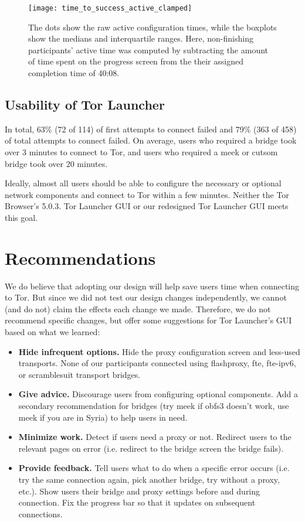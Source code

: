 \documentclass[USenglish,oneside,twocolumn]{article}
\begin{document}
\begin{figure}[t]
\centering
\texttt{[image: time\_to\_success\_active\_clamped]}
\caption{
The dots show the raw active configuration times,
while the boxplots show the medians and interquartile ranges.
Here, non-finishing participants' active time was computed by
subtracting the amount of time spent on the progress screen from the 
their assigned completion time of 40:08.
}
\label{fig:time_to_success_active_clamped}
\end{figure}

\subsection{Usability of Tor Launcher} 
In total, 63\% (72 of 114) of first attempts to connect failed and 79\% (363 of 458) of total attempts to connect failed. 
On average, users who required a bridge took over 3 minutes to connect to Tor, and users who required a meek or cutsom bridge took over 20 minutes.

Ideally, almost all users should be able to configure the necessary or optional network components and connect to Tor within a few minutes. Neither the Tor Browser's 5.0.3. Tor Launcher GUI or our redesigned Tor Launcher GUI meets this goal.

\section{Recommendations}
\label{sec:recommendations}
We do believe that adopting our design will help save users time when connecting to Tor. But since we did not test our design changes independently, we cannot (and do not) claim the effects each change we made. Therefore, we do not recommend specific changes, but offer some suggestions for Tor Launcher's GUI based on what we learned: \\

\begin{itemize}
\item {\bfseries Hide infrequent options.} Hide the proxy configuration screen and less-used transports. None of our participants connected using flashproxy, fte, fte-ipv6, or scramblesuit transport bridges. 
\item {\bfseries Give advice.} Discourage users from configuring optional components. Add a secondary recommendation for bridges (try meek if obfs3 doesn't work, use meek if you are in Syria) to help users in need. 
\item {\bfseries Minimize work.} Detect if users need a proxy or not. Redirect users to the relevant pages on error (i.e. redirect to the bridge screen the bridge fails).  
\item {\bfseries Provide feedback.} Tell users what to do when a specific error occurs (i.e. try the same connection again, pick another bridge, try without a proxy, etc.).  Show users their bridge and proxy settings before and during connection. Fix the progress bar so that it updates on subsequent connections.
\end{itemize}
\end{document}
